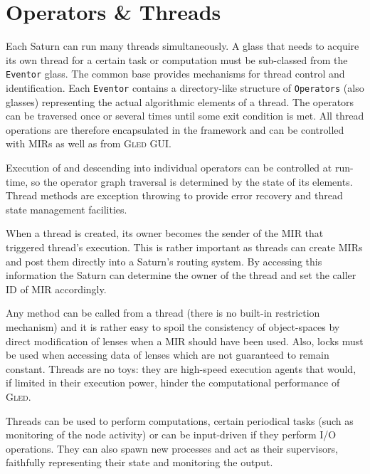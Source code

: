 \documentclass[final]{siamltex}
\def\gled{\textsc{Gled}\xspace}
\def\smalltt#1{{\small\texttt{#1}}}
\begin{document}
\section{Operators \& Threads}
\label{sec:threads}

Each Saturn can run many threads simultaneously. A glass that needs to
acquire its own thread for a certain task or computation must be
sub-classed from the \smalltt{Eventor} glass. The common base provides
mechanisms for thread control and identification. Each
\smalltt{Eventor} contains a directory-like structure of
\smalltt{Operators} (also glasses) representing the actual algorithmic
elements of a thread. The operators can be traversed once or
several times until some exit condition is met. All thread operations
are therefore encapsulated in the framework and can be controlled with
MIRs as well as from \gled GUI.

Execution of and descending into individual operators can be
controlled at run-time, so the operator graph traversal is determined
by the state of its elements. Thread methods are exception throwing to
provide error recovery and thread state management facilities.

When a thread is created, its owner becomes the sender of the MIR that
triggered thread's execution. This is rather important as threads can
create MIRs and post them directly into a Saturn's routing system.
By accessing this information the Saturn can determine the owner of
the thread and set the caller ID of MIR accordingly.

Any method can be called from a thread (there is no built-in
restriction mechanism) and it is rather easy to spoil the consistency
of object-spaces by direct modification of lenses when a MIR should have
been used. Also, locks must be used when accessing data of lenses
which are not guaranteed to remain constant. Threads are no toys: they
are high-speed execution agents that would, if limited in their
execution power, hinder the computational performance of \gled.

Threads can be used to perform computations, certain periodical tasks
(such as monitoring of the node activity) or can be input-driven if
they perform I/O operations. They can also spawn new processes and act
as their supervisors, faithfully representing their state and
monitoring the output.


\end{document}

